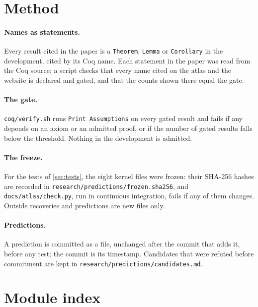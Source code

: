 
\appendix

\section{Method}\label{app:method}

\paragraph{Names as statements.} Every result cited in the paper is a \texttt{Theorem}, \texttt{Lemma}
or \texttt{Corollary} in the development, cited by its Coq name. Each statement in the paper was read
from the Coq source; a script checks that every name cited on the atlas and the website is declared
and gated, and that the counts shown there equal the gate.

\paragraph{The gate.} \texttt{coq/verify.sh} runs \texttt{Print Assumptions} on every gated result and
fails if any depends on an axiom or an admitted proof, or if the number of gated results falls below
the threshold. Nothing in the development is admitted.

\paragraph{The freeze.} For the tests of \cref{sec:tests}, the eight kernel files were frozen: their
SHA-256 hashes are recorded in \texttt{research/predictions/frozen.sha256}, and
\texttt{docs/atlas/check.py}, run in continuous integration, fails if any of them changes. Outside recoveries and predictions are new files only.

\paragraph{Predictions.} A prediction is committed as a file, unchanged after the commit that adds it,
before any test; the commit is its timestamp. Candidates that were refuted before commitment are kept in
\texttt{research/predictions/candidates.md}.

\section{Module index}\label{app:modules}

